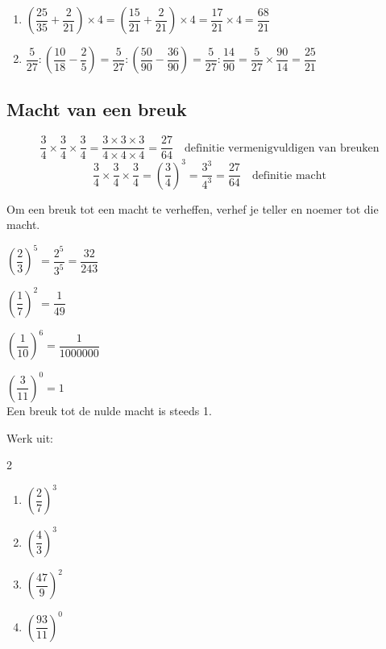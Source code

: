 \documentclass{bis}
\begin{document}
\begin{solution}
  \begin{enumerate}
    \item $\left(\dfrac{25}{35}+\dfrac{2}{21}\right)\times 4=\left(\dfrac{15}{21}+\dfrac{2}{21}\right)\times 4=\dfrac{17}{21}\times 4=\dfrac{68}{21}$
    \item $\dfrac{5}{27}:\left(\dfrac{10}{18}-\dfrac{2}{5}\right)=\dfrac{5}{27}:\left(\dfrac{50}{90}-\dfrac{36}{90}\right)=\dfrac{5}{27}:\dfrac{14}{90}=\dfrac{5}{27}\times\dfrac{90}{14}=\dfrac{25}{21}$
  \end{enumerate}
\end{solution}

\subsection{Macht van een breuk}

\[\dfrac{3}{4}\times\dfrac{3}{4}\times\dfrac{3}{4}=\dfrac{3\times 3\times 3}{4\times 4\times 4}=\dfrac{27}{64}\quad\text{definitie vermenigvuldigen van breuken}\]
\[\dfrac{3}{4}\times\dfrac{3}{4}\times\dfrac{3}{4}=\left(\dfrac{3}{4}\right)^3=\dfrac{3^3}{4^3}=\dfrac{27}{64}\quad\text{definitie macht}\]

\begin{onthoud}
Om een breuk tot een macht te verheffen, verhef je teller en noemer tot die macht.
\end{onthoud}

\begin{voorbeeld}
$\left(\dfrac{2}{3}\right)^5=\dfrac{2^5}{3^5}=\dfrac{32}{243}$
\end{voorbeeld}

\begin{voorbeeld}
$\left(\dfrac{1}{7}\right)^2=\dfrac{1}{49}$
\end{voorbeeld}

\begin{voorbeeld}
$\left(\dfrac{1}{10}\right)^6=\dfrac{1}{\num{1000000}}$
\end{voorbeeld}

\begin{voorbeeld}
$\left(\dfrac{3}{11}\right)^0=1$\\
Een breuk tot de nulde macht is steeds 1.
\end{voorbeeld}

\begin{exercise}
Werk uit:
\begin{multicols}{2}
  \begin{enumerate}
    \item $\left(\dfrac{2}{7}\right)^3$
    \item $\left(\dfrac{4}{3}\right)^3$
    \item $\left(\dfrac{47}{9}\right)^2$
    \item $\left(\dfrac{93}{11}\right)^0$
  \end{enumerate}
\end{multicols}
\end{exercise}
\end{document}
